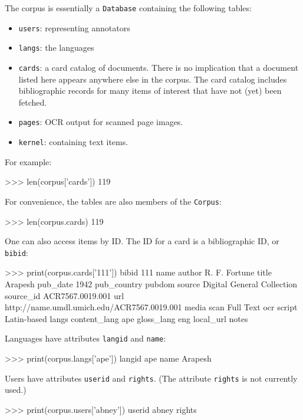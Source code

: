 The corpus is essentially a {\tt Database} containing the following tables:
\begin{itemize}
\item {\tt users}: representing annotators
\item {\tt langs}: the languages
\item {\tt cards}: a card catalog of documents.  There is no implication
that a document listed here appears anywhere else in the corpus.  The
card catalog includes bibliographic records for many items of interest
that have not (yet) been fetched.
\item {\tt pages}: OCR output for scanned page images.
\item {\tt kernel}: containing text items.
\end{itemize}
For example:
\begin{python}
>>> len(corpus['cards'])
119
\end{python}
For convenience, the tables are also members of the {\tt Corpus}:
\begin{python}
>>> len(corpus.cards)
119
\end{python}
One can also access items by ID.  The ID for a card is a bibliographic
ID, or {\tt bibid}:
\begin{python}
>>> print(corpus.cards['111'])
bibid        111
name         
author       R. F. Fortune
title        Arapesh
pub_date     1942
pub_country  
pubdom       
source       Digital General Collection
source_id    ACR7567.0019.001
url          http://name.umdl.umich.edu/ACR7567.0019.001
media        
scan         Full Text
ocr          
script       Latin-based
langs        
content_lang ape
gloss_lang   eng
local_url    
notes        
\end{python}
Languages have attributes {\tt langid} and {\tt name}:
\begin{python}
>>> print(corpus.langs['ape'])
langid ape
name   Arapesh
\end{python}
Users have attributes {\tt userid} and {\tt rights}.  (The attribute
{\tt rights} is not currently used.)
\begin{python}
>>> print(corpus.users['abney'])
userid abney
rights 
\end{python}

